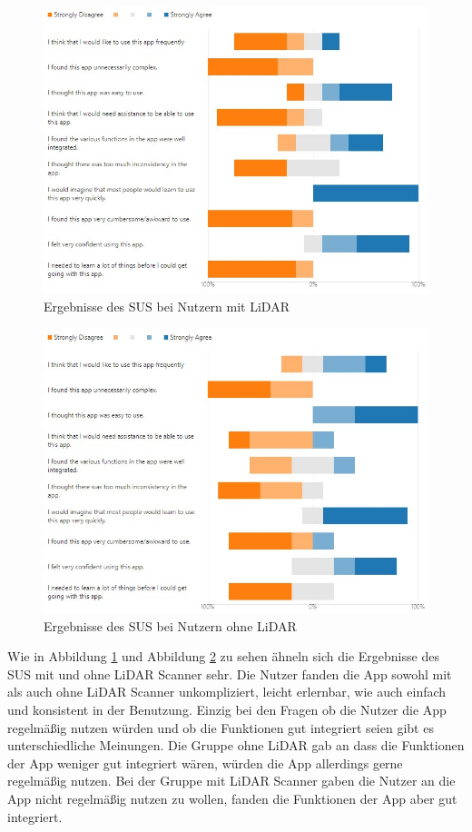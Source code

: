 \documentclass[titlepage, a4paper, 11pt]{scrartcl}
\begin{document}
      \begin{figure}[h]
      \centering
      \includegraphics[width=.6\textwidth]{SUS_LiDAR}
      \caption{Ergebnisse des SUS bei Nutzern mit LiDAR}
      \label{SUS_L}
      \end{figure}

      \begin{figure}[h!]
      \centering
      \includegraphics[width=.6\textwidth]{SUS_No_LiDAR}
      \caption{Ergebnisse des SUS bei Nutzern ohne LiDAR}
      \label{SUS_NL}
      \end{figure}

      Wie in Abbildung \ref{SUS_L} und Abbildung \ref{SUS_NL} zu sehen ähneln sich die Ergebnisse des SUS mit und ohne LiDAR Scanner sehr. 
      Die Nutzer fanden die App sowohl mit als auch ohne LiDAR Scanner unkompliziert, leicht erlernbar, wie auch einfach und konsistent in der Benutzung. 
      Einzig bei den Fragen ob die Nutzer die App regelmäßig nutzen würden und ob die Funktionen gut integriert seien gibt es unterschiedliche Meinungen. 
      Die Gruppe ohne LiDAR gab an dass die Funktionen der App weniger gut integriert wären, würden die App allerdings gerne regelmäßig nutzen. 
      Bei der Gruppe mit LiDAR Scanner gaben die Nutzer an die App nicht regelmäßig nutzen zu wollen, fanden die Funktionen der App aber gut integriert.\\
\end{document}
